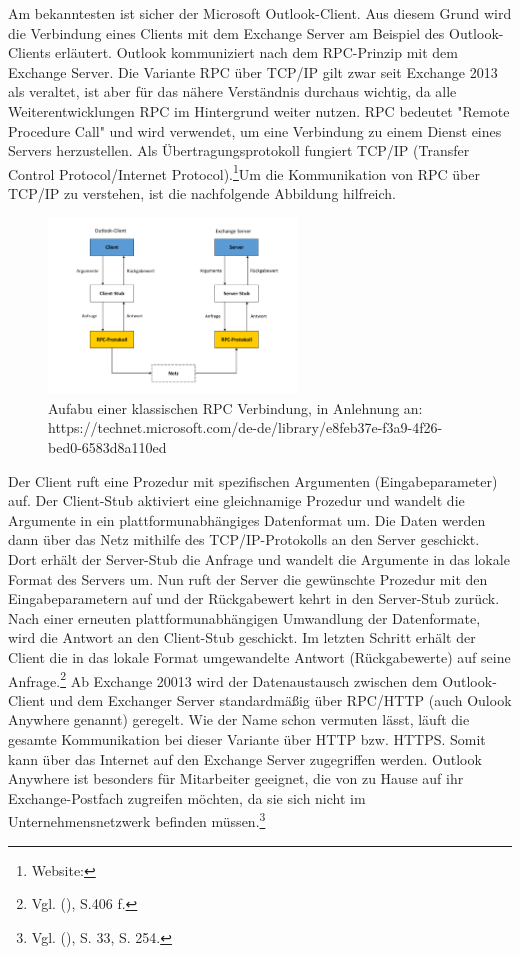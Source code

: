 Am bekanntesten ist sicher der Microsoft Outlook-Client. Aus diesem Grund wird die Verbindung eines Clients mit dem Exchange Server am Beispiel des Outlook-Clients erläutert. Outlook kommuniziert nach dem RPC-Prinzip mit dem Exchange Server. Die Variante RPC über TCP/IP  gilt zwar seit Exchange 2013 als veraltet, ist aber für das nähere Verständnis durchaus wichtig, da alle Weiterentwicklungen RPC im Hintergrund weiter nutzen. RPC bedeutet "Remote Procedure Call" und wird verwendet, um eine Verbindung zu einem Dienst eines Servers herzustellen. Als Übertragungsprotokoll fungiert TCP/IP (Transfer Control Protocol/Internet Protocol).\footnote{Website:\cite{MSXrpc}}Um die Kommunikation von RPC über TCP/IP zu verstehen, ist die nachfolgende Abbildung hilfreich.

\begin{figure}[h!]
\centering
	\includegraphics[width=0.59\textwidth]{Abbildungen/RPC_TCP}
	\caption[Aufbau einer klassischen RPC Verbindung]{Aufabu einer klassischen RPC Verbindung,    in Anlehnung an:\\https://technet.microsoft.com/de-de/library/e8feb37e-f3a9-4f26-bed0-6583d8a110ed}
	\label{fig:RPC_TCP}
\end{figure}

\noindent 
Der Client ruft eine Prozedur mit spezifischen Argumenten (Eingabeparameter) auf. Der Client-Stub aktiviert eine gleichnamige Prozedur und wandelt die Argumente in ein plattformunabhängiges Datenformat um. Die Daten werden dann über das Netz mithilfe des TCP/IP-Protokolls an den Server geschickt. Dort erhält der Server-Stub die Anfrage und wandelt die Argumente in das lokale Format des Servers um. Nun ruft der Server die gewünschte Prozedur mit den Eingabeparametern auf und der Rückgabewert kehrt in den Server-Stub zurück. Nach einer erneuten plattformunabhängigen Umwandlung der Datenformate, wird die Antwort an den Client-Stub geschickt. Im letzten Schritt erhält der Client die in das lokale Format umgewandelte Antwort (Rückgabewerte) auf seine Anfrage.\footnote{Vgl. \citeauthor{Schneider} (\citeyear{Schneider}), S.406 f.}\newline
Ab Exchange 20013 wird der Datenaustausch zwischen dem Outlook-Client und dem Exchanger Server standardmäßig über RPC/HTTP (auch Oulook Anywhere genannt) geregelt. Wie der Name schon vermuten lässt, läuft die gesamte Kommunikation bei dieser Variante über HTTP bzw. HTTPS. Somit kann über das Internet auf den Exchange Server zugegriffen werden. Outlook Anywhere ist besonders für Mitarbeiter geeignet, die von zu Hause auf ihr Exchange-Postfach zugreifen möchten, da sie sich nicht im Unternehmensnetzwerk befinden müssen.\footnote{Vgl. \citeauthor{Joos} (\citeyear{Joos}), S. 33, S. 254.}

